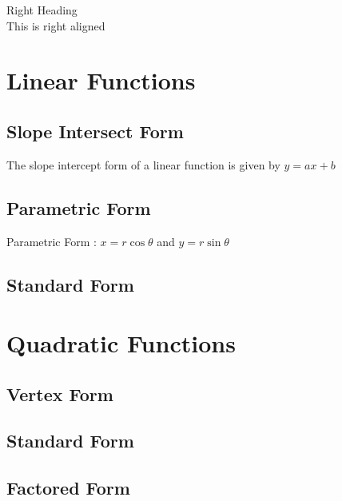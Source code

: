 \documentclass[11pt]{article}
\begin{document}
\begin{flushright}
Right Heading\\
This is right aligned
\end{flushright}

\section{Linear Functions}
	\subsection{Slope Intersect Form}
		The slope intercept form of a linear function is given by $y = ax + b$
	\subsection{Parametric Form}
		Parametric Form : $x = r\cos{\theta}$ and $y = r\sin{\theta}$
	\subsection{Standard Form}
\section{Quadratic Functions}
	\subsection{Vertex Form}
	\subsection{Standard Form}
	\subsection{Factored Form}
\end{document}
